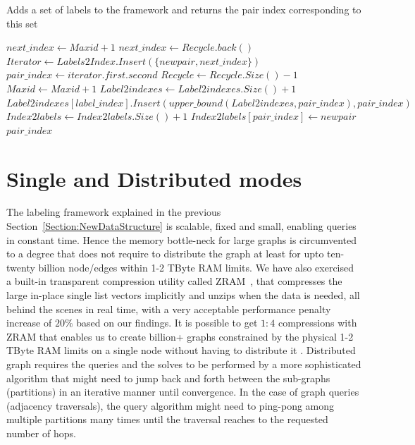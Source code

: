 \documentclass[preprint,3p,twocolumn]{elsarticle}
\begin{document}
\begin{algorithm*}
\caption{Adds a set of labels to the framework and returns the pair index corresponding to this set}
\begin{algorithmic}[1]
\State $next\_index \gets Maxid+1$
  \State $next\_index \gets Recycle.back()$
\EndIf  
\State $Iterator \gets Labels2Index.Insert(\{newpair, next\_index\})$
\State $pair\_index \gets iterator.first.second$ 
 
          \State $Recycle \gets Recycle.Size()-1$
    \Else
          \State $Maxid \gets Maxid + 1$
    \EndIf        
          \State $Label2indexes \gets Label2indexes.Size() + 1$        
       \EndIf
       \State $Label2indexes[label\_index].Insert(upper\_bound(Label2indexes,pair\_index),pair\_index)$
    \EndFor
       \State $Index2labels \gets Index2labels.Size() + 1$
    \EndIf
    \State $Index2labels[pair\_index] \gets newpair$         
\EndIf   
\State \Return $pair\_index$
\EndProcedure
\end{algorithmic}
\label{Algorithm:addlabel}
\end{algorithm*}

\section{Single and Distributed modes}
\label{Section:Parallelism}

The labeling framework explained in the previous Section~\ref{Section:NewDataStructure} is scalable, fixed and small, enabling queries in constant time. Hence the memory bottle-neck for large graphs is circumvented to a degree that does not require to distribute the graph at least for upto ten-twenty billion node/edges within 1-2 TByte RAM limits. We have also exercised a built-in transparent compression utility called ZRAM~\cite{zram}, that compresses the large in-place single list vectors implicitly and unzips when the data is needed, all behind the scenes in real time, with a very acceptable performance penalty increase of $20\%$ based on our findings. It is possible to get $1\colon4$ compressions with ZRAM that enables us to create billion+ graphs constrained by the physical 1-2 TByte RAM limits on a single node without having to distribute it . Distributed graph requires the queries and the solves to be performed by a more sophisticated algorithm that might need to jump back and forth between the sub-graphs (partitions) in an iterative manner until convergence. In the case of graph queries (adjacency traversals), the query algorithm might need to ping-pong among multiple partitions many times until the traversal reaches to the requested number of hops. 
\end{document}
